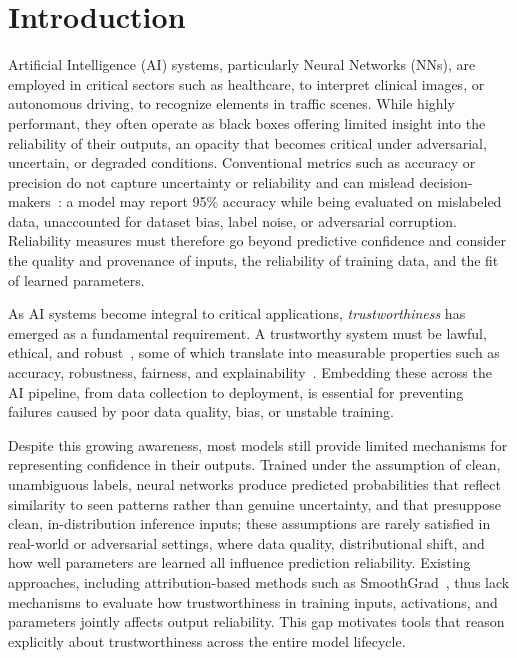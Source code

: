 \vspace{-0.5em}
\section{Introduction}

Artificial Intelligence (AI) systems, particularly Neural Networks (NNs), are employed in critical sectors such as healthcare, to interpret clinical images, or autonomous driving, to recognize elements in traffic scenes. While highly performant, they often operate as black boxes offering limited insight into the reliability of their outputs, an opacity that becomes critical under adversarial, uncertain, or degraded conditions. Conventional metrics such as accuracy or precision do not capture uncertainty or reliability and can mislead decision-makers~\cite{10.1145/3290605.3300509}: a model may report 95\% accuracy while being evaluated on mislabeled data, unaccounted for dataset bias, label noise, or adversarial corruption. Reliability measures must therefore go beyond predictive confidence and consider the quality and provenance of inputs, the reliability of training data, and the fit of learned parameters.

As AI systems become integral to critical applications, \emph{trustworthiness} has emerged as a fundamental requirement. A trustworthy system must be lawful, ethical, and robust~\cite{ec2019ethics}, some of which translate into measurable properties such as accuracy, robustness, fairness, and explainability~\cite{10.3389/fdata.2024.1467222}. Embedding these across the AI pipeline, from data collection to deployment, is essential for preventing failures caused by poor data quality, bias, or unstable training. 

Despite this growing awareness, most models still provide limited mechanisms for representing confidence in their outputs. Trained under the assumption of clean, unambiguous labels, neural networks produce predicted probabilities that reflect similarity to seen patterns rather than genuine uncertainty, and that presuppose clean, in-distribution inference inputs; these assumptions are rarely satisfied in real-world or adversarial settings, where data quality, distributional shift, and how well parameters are learned all influence prediction reliability. Existing approaches, including attribution-based methods such as SmoothGrad~\cite{smilkov2017smoothgradremovingnoiseadding}, thus lack mechanisms to evaluate how trustworthiness in training inputs, activations, and parameters jointly affects output reliability. This gap motivates tools that reason explicitly about trustworthiness across the entire model lifecycle.

